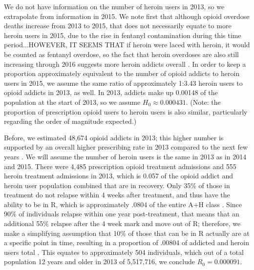 \documentclass[12pt]{article}
\begin{document}
 We do not have information on the number of heroin users in 2013, so we extrapolate from information in 2015. We note first that although opioid overdose deaths increase from 2013 to 2015, that does not necessarily equate to more heroin users in 2015, due to the rise in fentanyl contamination during this time period...HOWEVER, IT SEEMS THAT if heroin were laced with heroin, it would be counted as fentanyl overdose, so the fact that heroin overdoses are also still increasing through 2016 suggests more heroin addicts overall \cite{CDC4}. In order to keep a proportion approximately equivalent to the number of opioid addicts to heroin users in 2015, we assume the same ratio of approximately 1:3.43 heroin users to opioid addicts in 2013, as well. In 2013, addicts make up 0.00148 of the population at the start of 2013, so we assume $H_0 \approx 0.000431.$ (Note: the proportion of prescription opioid users to heroin users is also similar, particularly regarding the order of magnitude expected.)

Before, we estimated 48,674 opioid addicts in 2013; this higher number is supported by an overall higher prescribing rate in 2013 compared to the next few years \cite{CDC7}.
We will assume the number of heroin users is the same in 2013 as in 2014 and 2015. There were 4,485 prescription opioid treatment admissions and 555 heroin treatment admissions in 2013, which is 0.057 of the opioid addict and heroin user population combined that are in recovery. Only 35\% of those in treatment do not relapse within 4 weeks after treatment, and thus have the ability to be in R, which is approximately .0804 of the entire A+H class \cite{Bailey}.
Since 90\% of individuals relapse within one year post-treatment, that means that an additional 55\% relapse after the 4 week mark and move out of R; therefore, we make a simplifying assumption that 10\% of those that can be in R actually are at a specific point in time, resulting in a proportion of .00804 of addicted and heroin users total \cite{Bailey}. This equates to approximately 504 individuals, which out of a total population 12 years and older in 2013 of 5,517,716, we conclude $R_0=0.000091.$\\
\end{document}

